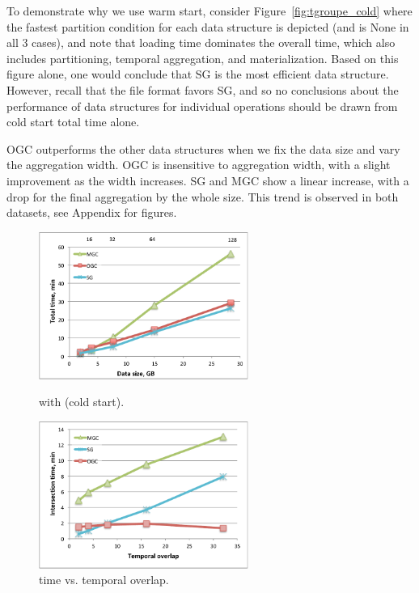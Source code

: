 To demonstrate why we use warm start, consider
Figure~\ref{fig:tgroupe_cold} where the fastest partition condition
for each data structure is depicted (and is None in all 3 cases), and
note that loading time dominates the overall time, which also includes
partitioning, temporal aggregation, and materialization.  Based on
this figure alone, one would conclude that SG is the most efficient
data structure.  However, recall that the file format favors SG, and
so no conclusions about the performance of data structures for
individual operations should be drawn from cold start total time
alone.  

OGC outperforms the other data structures when we fix the data size
and vary the aggregation width.  OGC is insensitive to aggregation
width, with a slight improvement as the width increases.  SG and MGC
show a linear increase, with a drop for the final aggregation by the
whole size.  This trend is observed in both datasets, see Appendix for
figures.

\begin{figure}
\centering
\begin{minipage}{3in}
  \centering
  \includegraphics[width=2.7in]{figs/tgroupe_cold.pdf}
\vspace{-0.1in}
  \caption{ with  (cold start).}
\label{fig:tgroupe_cold}
\vspace{-0.1in}
\end{minipage}
\begin{minipage}{3in}
  \centering
\includegraphics[width=2.7in]{figs/tand_all_warm.pdf}
\vspace{-0.1in}
\caption{ time vs. temporal overlap.}
\label{fig:tandall}
\vspace{-0.1in}
\end{minipage}
\end{figure}

